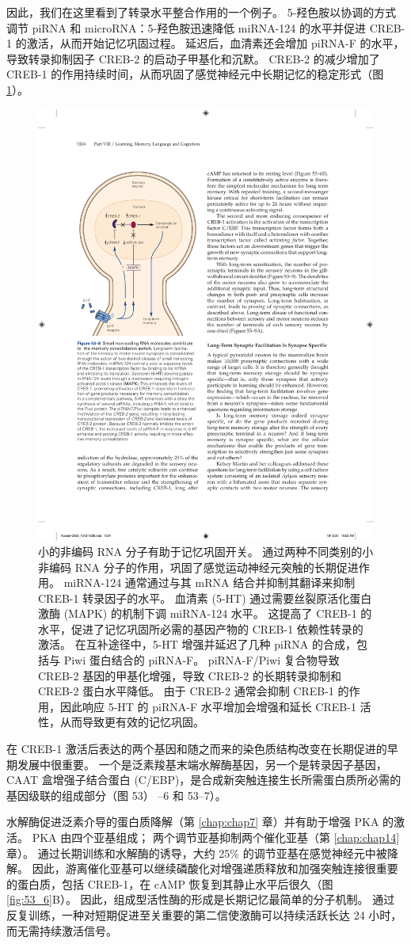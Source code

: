 因此，我们在这里看到了转录水平整合作用的一个例子。 5-羟色胺以协调的方式调节 piRNA 和 microRNA：5-羟色胺迅速降低 miRNA-124 的水平并促进 CREB-1 的激活，从而开始记忆巩固过程。 延迟后，血清素还会增加 piRNA-F 的水平，导致转录抑制因子 CREB-2 的启动子甲基化和沉默。 CREB-2 的减少增加了 CREB-1 的作用持续时间，从而巩固了感觉神经元中长期记忆的稳定形式（图 \ref{fig:53_8}）。

\begin{figure}[htbp]
	\centering
	\includegraphics[width=0.5\linewidth]{chap53/fig_53_8}
	\caption{小的非编码 RNA 分子有助于记忆巩固开关。 通过两种不同类别的小非编码 RNA 分子的作用，巩固了感觉运动神经元突触的长期促进作用。 miRNA-124 通常通过与其 mRNA 结合并抑制其翻译来抑制 CREB-1 转录因子的水平。 血清素 (5-HT) 通过需要丝裂原活化蛋白激酶 (MAPK) 的机制下调 miRNA-124 水平。 这提高了 CREB-1 的水平，促进了记忆巩固所必需的基因产物的 CREB-1 依赖性转录的激活。 在互补途径中，5-HT 增强并延迟了几种 piRNA 的合成，包括与 Piwi 蛋白结合的 piRNA-F。 piRNA-F/Piwi 复合物导致 CREB-2 基因的甲基化增强，导致 CREB-2 的长期转录抑制和 CREB-2 蛋白水平降低。 由于 CREB-2 通常会抑制 CREB-1 的作用，因此响应 5-HT 的 piRNA-F 水平增加会增强和延长 CREB-1 活性，从而导致更有效的记忆巩固。}
	\label{fig:53_8}
\end{figure}

在 CREB-1 激活后表达的两个基因和随之而来的染色质结构改变在长期促进的早期发展中很重要。 一个是泛素羧基末端水解酶基因，另一个是转录因子基因，CAAT 盒增强子结合蛋白 (C/EBP)，是合成新突触连接生长所需蛋白质所必需的基因级联的组成部分（图 53） –6 和 53–7）。

水解酶促进泛素介导的蛋白质降解（第 \ref{chap:chap7} 章）并有助于增强 PKA 的激活。 PKA 由四个亚基组成； 两个调节亚基抑制两个催化亚基（第 \ref{chap:chap14} 章）。 通过长期训练和水解酶的诱导，大约 25\% 的调节亚基在感觉神经元中被降解。 因此，游离催化亚基可以继续磷酸化对增强递质释放和加强突触连接很重要的蛋白质，包括 CREB-1，在 cAMP 恢复到其静止水平后很久（图 \ref{fig:53_6}B）。 因此，组成型活性酶的形成是长期记忆最简单的分子机制。 通过反复训练，一种对短期促进至关重要的第二信使激酶可以持续活跃长达 24 小时，而无需持续激活信号。

